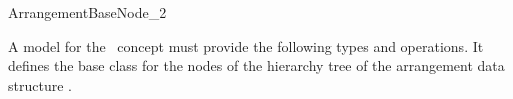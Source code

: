 
\ccRefPageBegin

\begin{ccRefConcept}{ArrangementBaseNode_2}
\label{sec:base_node}

\ccDefinition
    A model for the \ccRefName\ concept must provide the following
    types and operations. It defines the base class for the nodes of
    the hierarchy tree of the arrangement data structure
    .

\ccTypes

\ccOperations

\ccHasModels

\end{ccRefConcept}
\ccRefPageEnd
